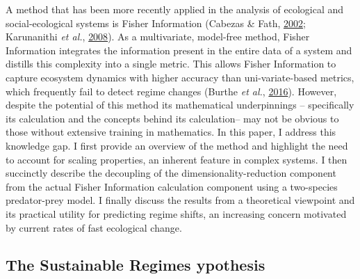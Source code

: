 \documentclass[print]{nuthesis}
\begin{document}
A method that has been more recently applied in the analysis of ecological and social-ecological systems is Fisher Information (Cabezas \& Fath, \protect\hyperlink{ref-cabezas_towards_2002}{2002}; Karunanithi \emph{et al.}, \protect\hyperlink{ref-karunanithi_detection_2008}{2008}). As a multivariate, model-free method, Fisher Information integrates the information present in the entire data of a system and distills this complexity into a single metric. This allows Fisher Information to capture ecosystem dynamics with higher accuracy than uni-variate-based metrics, which frequently fail to detect regime changes (Burthe \emph{et al.}, \protect\hyperlink{ref-burthe2016early}{2016}). However, despite the potential of this method its mathematical underpinnings -- specifically its calculation and the concepts behind its calculation-- may not be obvious to those without extensive training in mathematics. In this paper, I address this knowledge gap. I first provide an overview of the method and highlight the need to account for scaling properties, an inherent feature in complex systems. I then succinctly describe the decoupling of the dimensionality-reduction component from the actual Fisher Information calculation component using a two-species predator-prey model. I finally discuss the results from a theoretical viewpoint and its practical utility for predicting regime shifts, an increasing concern motivated by current rates of fast ecological change.

\hypertarget{the-sustainable-regimes-ypothesis}{%
\subsection{The Sustainable Regimes ypothesis}\label{the-sustainable-regimes-ypothesis}}
\end{document}
